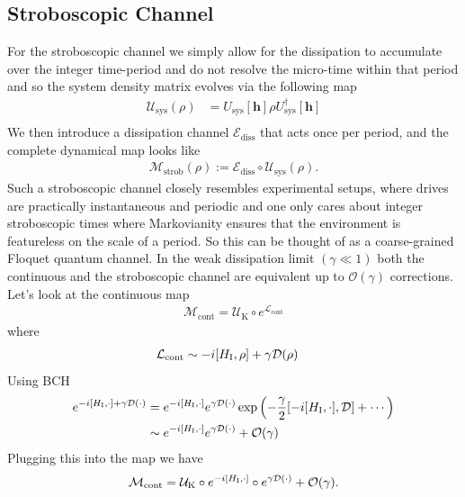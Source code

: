 \subsection{Stroboscopic Channel}
For the stroboscopic channel we simply allow for the dissipation to accumulate over the integer time-period and do not resolve the micro-time within that period and so the system density matrix evolves via the following map
\begin{align}
    \mathcal{U}_{\text{sys}}(\rho)&= U_{\text{sys}}[\bm{h}] \rho U^\dagger_{\text{sys}}[\bm{h}] \nonumber\\
\end{align}
We then introduce a dissipation channel $\mathcal{E}_{\text{diss}}$ that acts once per period, and the complete dynamical map looks like
\begin{align}
    \mathcal{M}_{\text{strob}}(\rho):=\mathcal{E
    }_{\text{diss}} \circ \mathcal{U}_{\text{sys}}(\rho).
\end{align}
Such a stroboscopic channel closely resembles experimental setups, where drives are practically instantaneous and periodic and one only cares about integer stroboscopic times where Markovianity ensures that the environment is featureless on the scale of a period. So this can be thought of as a coarse-grained Floquet quantum channel.
\newline
In the weak dissipation limit $(\gamma \ll 1)$ both the continuous and the stroboscopic channel are equivalent up to $\mathcal{O}(\gamma)$ corrections.
\\[4pt]
Let's look at the continuous map
\begin{align}
    \mathcal{M}_{\text{cont}}= \mathcal{U}_{\text{K}} \circ e^{\mathcal{L}_{\text{cont}}}
\end{align}
where
\begin{align}
    \mathcal{L}_\text{cont} &\sim -i[H_{\text{I}},\rho]+\gamma \mathcal{D}(\rho) \nonumber
\end{align}
Using BCH
\begin{align}
    e^{-i[H_{\text{I}},\cdot]+\gamma \mathcal{D}(\cdot)}&= e^{-i[H_{\text{I}},\cdot]}e^{\gamma \mathcal{D}(\cdot)} \exp \left(-\frac{\gamma}{2}[-i[H_{\text{I}},\cdot],\mathcal{D}]+\cdots\right) \nonumber \\
    &\sim e^{-i[H_{\text{I}},\cdot]}e^{\gamma \mathcal{D}(\cdot)} + \mathcal{O}(\gamma)
\end{align}
Plugging this into the map we have
\begin{align}
    \mathcal{M}_{\text{cont}}=\mathcal{U}_{\text{K}} \circ e^{-i[H_{\text{I}},\cdot]} \circ e^{\gamma \mathcal{D}(\cdot)} + \mathcal{O}(\gamma).
\end{align}
